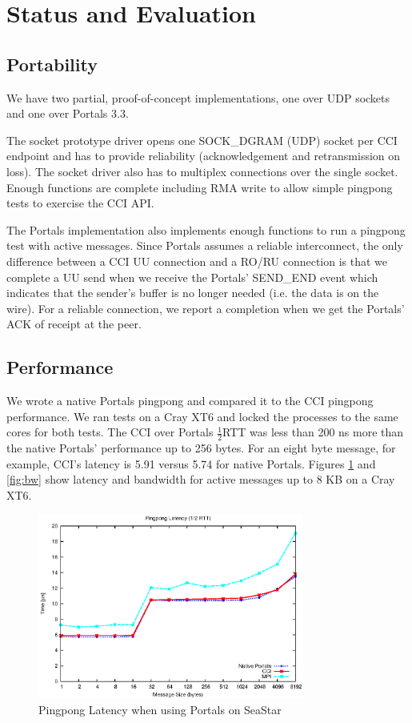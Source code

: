 
\section{Status and Evaluation}

\subsection{Portability}
We have two partial, proof-of-concept implementations, one over UDP sockets and
one over Portals 3.3.

The socket prototype driver opens one SOCK\_DGRAM (UDP) socket per CCI endpoint
and has to provide reliability (acknowledgement and retransmission on loss).
The socket driver also has to multiplex connections over the single socket.
Enough functions are complete including RMA write to allow simple pingpong
tests to exercise the CCI API.

The Portals implementation also implements enough functions to run a pingpong
test with active messages. Since Portals assumes a reliable interconnect, the
only difference between a CCI UU connection and a RO/RU connection is that we
complete a UU send when we receive the Portals' SEND\_END event which indicates
that the sender's buffer is no longer needed (i.e. the data is on the wire).
For a reliable connection, we report a completion when we get the Portals' ACK
of receipt at the peer.

\subsection{Performance}
We wrote a native Portals pingpong and compared it to the CCI pingpong
performance. We ran tests on a Cray XT6 and locked the processes to the same
cores for both tests. The CCI over Portals \begin{math}\frac{1}{2}\end{math}RTT
was less than 200 ns more than the native Portals' performance up to 256 bytes.
For an eight byte message, for example, CCI's latency is 5.91 \us versus 5.74
\us for native Portals. Figures \ref{fig:latency} and \ref{fig:bw} show latency
and bandwidth for active messages up to 8 KB on a Cray XT6.

\begin{figure}[htbp]
\centering
\includegraphics[width=3.45in]{pingpong-latency.eps}
\caption{Pingpong Latency when using Portals on SeaStar}
\label{fig:latency}
\end{figure}

